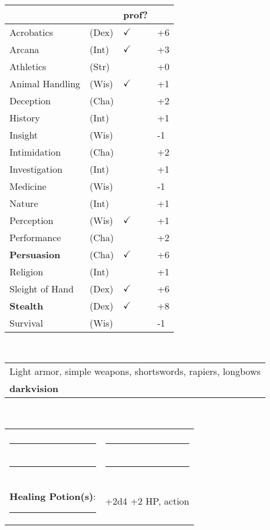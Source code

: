 \documentclass[twocolumn]{article}
\begin{document}
\\
\noindent\begin{tabular}{llll}
 & & prof? & \\
\hline
Acrobatics & (Dex) & $\checkmark$ &+6 \\
Arcana & (Int) & $\checkmark$ & +3 \\ 
Athletics & (Str) &  & +0\\
Animal Handling & (Wis) & $\checkmark$ & +1\\
Deception & (Cha) &  & +2\\
History & (Int) &  & +1 \\
Insight & (Wis) &  & -1 \\
Intimidation & (Cha) &  & +2 \\
Investigation & (Int) &  & +1 \\
Medicine & (Wis) &  & -1 \\
Nature & (Int) &  & +1 \\
Perception & (Wis) & $\checkmark$ & +1 \\
Performance & (Cha) &  & +2 \\
\textbf{Persuasion} & (Cha) & $\checkmark$ & +6 \\
Religion & (Int) &  & +1 \\
Sleight of Hand & (Dex) & $\checkmark$ & +6 \\
\textbf{Stealth} & (Dex) & $\checkmark$ & +8 \\
Survival & (Wis) &  & -1 \\
\hline
\end{tabular}
\vspace{12pt}

\\
\noindent\begin{tabular}{|m{3.1in}|}
\hline
Light armor, simple weapons, shortswords, rapiers, longbows \\
\textbf{darkvision} \\
\hline
\end{tabular}
\vspace{12pt}


\\
\noindent\begin{tabular}{|ll|}
\hline&\\
\rule{1.4in}{.2pt}&\rule{1.4in}{.2pt}\\
\rule{1.4in}{.2pt}&\rule{1.4in}{.2pt}\\
\textbf{Healing Potion(s)}: \rule{.2in}{.2pt}& +2d4 +2 HP, {\sc action}\\
\hline
\end{tabular}
\vspace{12pt}
\end{document}
